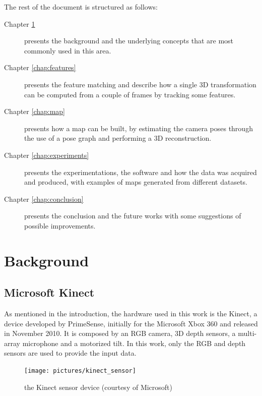 The rest of the document is structured as follows:
\begin{description}
\item[Chapter \ref{chap:background}] presents the background and the underlying concepts that are most commonly used in this area.
\item[Chapter \ref{chap:features}] presents the feature matching and describe how a single 3D transformation can be computed  from a couple of frames by tracking some features.
\item[Chapter \ref{chap:map}] presents how a map can be built, by estimating the camera poses through the use of a pose graph and performing a 3D reconstruction.
\item[Chapter \ref{chap:experiments}] presents the experimentations, the software and how the data was acquired and produced, with examples of maps generated from different datasets.
\item[Chapter \ref{chap:conclusion}] presents the conclusion and the future works with some suggestions of possible improvements.
\end{description}

\chapter{Background}
\label{chap:background}

\section{Microsoft Kinect}

As mentioned in the introduction, the hardware used in this work is the Kinect, a device developed by PrimeSense, initially for the Microsoft Xbox 360 and released in November 2010. It is composed by an RGB camera, 3D depth sensors, a multi-array microphone and a motorized tilt. In this work, only the RGB and depth sensors are used to provide the input data.

\begin{figure}[H]
\centering
\texttt{[image: pictures/kinect\_sensor]}
\caption{the Kinect sensor device (courtesy of Microsoft)}
\end{figure}

